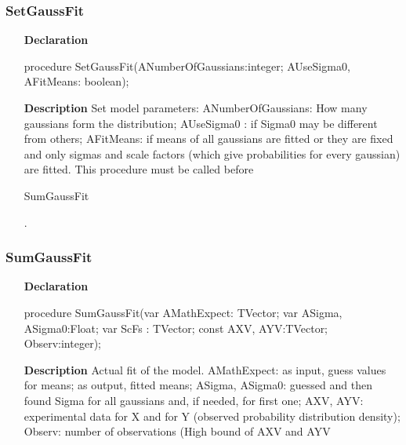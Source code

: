 \documentclass[12pt,a4paper,oneside]{report}
\newcommand{\declarationitem}[1]{\textbf{#1}}
\newcommand{\descriptiontitle}[1]{\textbf{#1}}
\begin{document}
\subsubsection{SetGaussFit}
\label{ugauss-SetGaussFit}
\begin{itemize}\item[\declarationitem{Declaration}\hfill]
	\begin{flushleft}
		\begin{ttfamily}
			procedure SetGaussFit(ANumberOfGaussians:integer; AUseSigma0, AFitMeans: boolean);\end{ttfamily}
		
	\end{flushleft}
	
	\par
	\item[\descriptiontitle{Description}]
	Set model parameters: ANumberOfGaussians: How many gaussians form the distribution; AUseSigma0 : if Sigma0 may be different from others; AFitMeans: if means of all gaussians are fitted or they are fixed and only sigmas and scale factors (which give probabilities for every gaussian) are fitted. This procedure must be called before \begin{ttfamily} SumGaussFit \end{ttfamily}.
	
\end{itemize}
\subsubsection{SumGaussFit}
\label{ugauss-SumGaussFit}
\begin{itemize}\item[\declarationitem{Declaration}\hfill]
	\begin{flushleft}
		\begin{ttfamily}
			procedure SumGaussFit(var AMathExpect: TVector; var ASigma, ASigma0:Float; var ScFs : TVector; const AXV, AYV:TVector; Observ:integer);\end{ttfamily}
		
	\end{flushleft}
	
	\par
	\item[\descriptiontitle{Description}]
	Actual fit of the model. AMathExpect: as input, guess values for means; as output, fitted means; ASigma, ASigma0: guessed and then found Sigma for all gaussians and, if needed, for first one; AXV, AYV: experimental data for X and for Y (observed probability distribution density); Observ: number of observations (High bound of AXV and AYV
	
\end{itemize}
\end{document}
